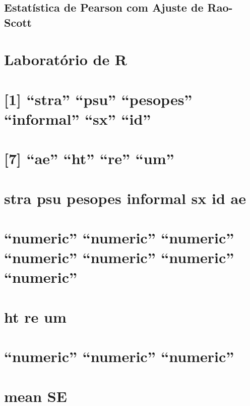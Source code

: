 \documentclass[]{book}
\theoremstyle{definition}
\theoremstyle{definition}
\theoremstyle{definition}
\theoremstyle{remark}
\begin{document}
\subsection{Estatística de Pearson com Ajuste de
Rao-Scott}\label{estatistica-de-pearson-com-ajuste-de-rao-scott}

\section{Laboratório de R}\label{laboratorio-de-r-5}

\section{\texorpdfstring{{[}1{]} ``stra'' ``psu'' ``pesopes''
``informal'' ``sx''
``id''}{{[}1{]} stra psu pesopes informal sx id}}\label{stra-psu-pesopes-informal-sx-id-1}

\section{\texorpdfstring{{[}7{]} ``ae'' ``ht'' ``re''
``um''}{{[}7{]} ae ht re um}}\label{ae-ht-re-um-1}

\section{stra psu pesopes informal sx id
ae}\label{stra-psu-pesopes-informal-sx-id-ae-1}

\section{\texorpdfstring{``numeric'' ``numeric'' ``numeric'' ``numeric''
``numeric'' ``numeric''
``numeric''}{numeric numeric numeric numeric numeric numeric numeric}}\label{numeric-numeric-numeric-numeric-numeric-numeric-numeric-1}

\section{ht re um}\label{ht-re-um-1}

\section{\texorpdfstring{``numeric'' ``numeric''
``numeric''}{numeric numeric numeric}}\label{numeric-numeric-numeric-1}

\section{mean SE}\label{mean-se}
\end{document}
